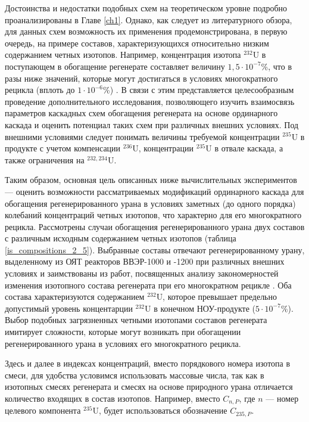 Достоинства и недостатки подобных схем на теоретическом уровне подробно проанализированы в Главе \ref{ch1}. Однако, как следует из литературного обзора, для данных схем возможность их применения продемонстрирована, в первую очередь, на примере составов, характеризующихся относительно низким содержанием четных изотопов. Например, концентрация изотопа $^{232}$U в поступающем в обогащение регенерате составляет величину $1,5\cdot10^{-7}$\%, что в разы ниже значений, которые могут достигаться в условиях многократного рецикла (вплоть до $1\cdot10^{-6}$\%) \cite{palkinDesignanalyticalResearchRefinement2010}.
В связи с этим представляется целесообразным проведение дополнительного исследования, позволяющего изучить взаимосвязь параметров каскадных схем обогащения регенерата на основе ординарного каскада и оценить потенциал таких схем при различных внешних условиях. Под внешними условиями следует понимать величины требуемой концентрации $^{235}$U в продукте с учетом компенсации $^{236}$U, концентрации $^{235}$U в отвале каскада, а также ограничения на $^{232,234}$U.

Таким образом, основная цель описанных ниже вычислительных экспериментов --- оценить возможности рассматриваемых модификаций ординарного каскада для обогащения регенерированного урана в условиях заметных (до одного порядка) колебаний концентраций четных изотопов, что характерно для его многократного рецикла. Рассмотрены случаи обогащения регенерированного урана двух составов с различным исходным содержанием четных изотопов (таблица \ref{is_compositions_2_5}). Выбранные составы отвечают регенерированному урану, выделенному из ОЯТ реакторов ВВЭР-1000 и -1200 при различных внешних условиях  и заимствованы из работ, посвященных анализу закономерностей изменения изотопного состава регенерата при его многократном рецикле \cite{palkinDesignanalyticalResearchRefinement2010,nevinicaToplivnyyCiklLegkovodnogo2019}. Оба состава характеризуются содержанием $^{232}$U, которое превышает предельно допустимый уровень концентарции $^{232}$U в конечном НОУ-продукте ($5\cdot10^{-7}$\%). Выбор подобных загрязненных четными изотопами составов регенерата имитирует сложности, которые могут возникать при обогащении регенерированного урана в условиях его многократного рецикла.

Здесь и далее в индексах концентраций, вместо порядкового номера изотопа в смеси, для удобства условимся использовать массовые числа, так как в изотопных смесях регенерата и смесях на основе природного урана отличается количество входящих в состав изотопов. Например, вместо $C_{n,P}$, где $n$ --- номер целевого компонента $^{235}$U, будет использоваться обозначение $C_{235,P}$.

